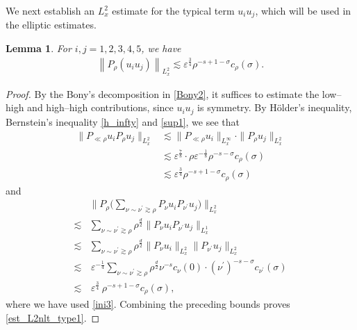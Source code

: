 \documentclass[11pt,letterpaper,reqno]{amsart}
\numberwithin{equation}{section}
\newtheorem{lemma}[theorem]{Lemma}
\theoremstyle{definition}
\theoremstyle{remark}
\begin{document}
We next establish an $L_x^2$ estimate for the typical term $ u_i u_j$, which will be used in the elliptic estimates.
\begin{lemma} \label{lem_l2space_u2}
	For $ i,j =1,2,3,4,5 $, we have
	\begin{align}
\left\| P_\rho (u_i  u_{j} )\right\|_{L^2_x}\lesssim  \varepsilon^{\frac 34}    \rho^{-s+1 -\sigma} c_\rho (\sigma). \label{est_L2nlt_type1}
	\end{align}
\end{lemma}
\begin{proof}
	By the Bony's decomposition in  \eqref{Bony2},  it suffices to estimate the low--high and high--high contributions, since   \(u_i u_j\) is symmetry.
	By H\"older's inequality,  Bernstein's inequality \eqref{h_infty} and \eqref{sup1}, we see that
	\begin{align*}  
		\| P_{\ll \rho} u_i P_\rho   u_{j}\|_{L^2_x}& 
		\lesssim \|P_{\ll \rho} u_i\|_{L^\infty_x} \cdot  \| P_\rho u_{j}\|_{L^2_x}\nonumber\\
		&\lesssim \varepsilon^{\frac 78} \cdot \rho  \varepsilon^{-\frac 18} \rho^{-s -\sigma} c_\rho (\sigma)\nonumber \\
		&\lesssim  \varepsilon^{\frac 34}    \rho^{-s + 1-\sigma} c_\rho (\sigma) \nonumber
	\end{align*}
	and  
	\begin{align*} 
		&\Big\| P_\rho\big(\sum_{ \nu\sim \nu^{\prime} \gtrsim \rho} P_\nu u_i   P_{\nu^\prime}   u_{j}\big)\Big\|_{L^2_x} \\
		 \lesssim &\sum_{ \nu\sim \nu^{\prime} \gtrsim \rho}\rho^{\frac d2} \| P_\nu u_i   P_{\nu^\prime}   u_{j} \|_{L^1_x} \nonumber\\
		\lesssim &\sum_{ \nu\sim \nu^{\prime} \gtrsim \rho}\rho^{\frac d2} \| P_\nu u_i \|_{L^2_x} \|   P_{\nu^\prime}   u_{j} \|_{L^2_x} \nonumber \\
		\lesssim &\,\varepsilon^{-\frac 14}  \sum_{ \nu\sim \nu^{\prime} \gtrsim \rho}\rho^{\frac d2} \nu^{-s } c_\nu (0)  \cdot   (\nu^\prime)^{-s -\sigma} c_{\nu^\prime} (\sigma) \nonumber\\
		\lesssim & \,\varepsilon^{\frac 34}\   \rho^{-s +1-\sigma} c_\rho (\sigma),\nonumber
	\end{align*} 
    where we have used \eqref{ini3}.
Combining the preceding bounds proves \eqref{est_L2nlt_type1}.
	\end{proof}
\end{document}
